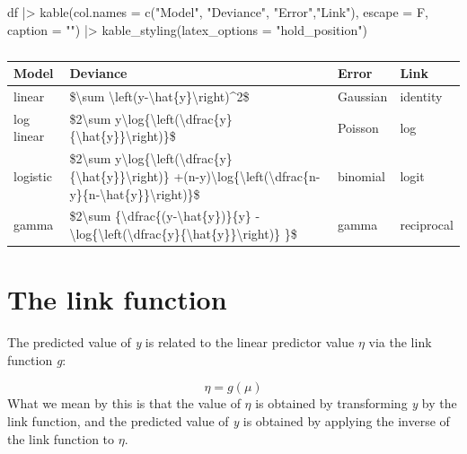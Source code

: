 \documentclass[
  letterpaper,
  DIV=11,
  numbers=noendperiod]{scrreprt}
\newenvironment{Shaded}{\begin{snugshade}}{\end{snugshade}}
\newcommand{\AttributeTok}[1]{\textcolor[rgb]{0.40,0.45,0.13}{#1}}
\newcommand{\FunctionTok}[1]{\textcolor[rgb]{0.28,0.35,0.67}{#1}}
\newcommand{\NormalTok}[1]{\textcolor[rgb]{0.00,0.23,0.31}{#1}}
\newcommand{\SpecialCharTok}[1]{\textcolor[rgb]{0.37,0.37,0.37}{#1}}
\newcommand{\StringTok}[1]{\textcolor[rgb]{0.13,0.47,0.30}{#1}}
\begin{document}
\begin{Shaded}
\begin{Highlighting}[]
\NormalTok{df }\SpecialCharTok{|\textgreater{}}
  \FunctionTok{kable}\NormalTok{(}\AttributeTok{col.names =} \FunctionTok{c}\NormalTok{(}\StringTok{"Model"}\NormalTok{, }\StringTok{"Deviance"}\NormalTok{, }\StringTok{"Error"}\NormalTok{,}\StringTok{"Link"}\NormalTok{), }\AttributeTok{escape =}\NormalTok{ F, }\AttributeTok{caption =} \StringTok{""}\NormalTok{) }\SpecialCharTok{|\textgreater{}}
  \FunctionTok{kable\_styling}\NormalTok{(}\AttributeTok{latex\_options =} \StringTok{"hold\_position"}\NormalTok{)}
\end{Highlighting}
\end{Shaded}

\begin{longtable}[t]{llll}
\caption{}\\
\toprule
Model & Deviance & Error & Link\\
\midrule
linear & \$\textbackslash{}sum \textbackslash{}left(y-\textbackslash{}hat\{y\}\textbackslash{}right)\textasciicircum{}2\$ & Gaussian & identity\\
log linear & \$2\textbackslash{}sum y\textbackslash{}log\{\textbackslash{}left(\textbackslash{}dfrac\{y\}\{\textbackslash{}hat\{y\}\}\textbackslash{}right)\}\$ & Poisson & log\\
logistic & \$2\textbackslash{}sum y\textbackslash{}log\{\textbackslash{}left(\textbackslash{}dfrac\{y\}\{\textbackslash{}hat\{y\}\}\textbackslash{}right)\} +(n-y)\textbackslash{}log\{\textbackslash{}left(\textbackslash{}dfrac\{n-y\}\{n-\textbackslash{}hat\{y\}\}\textbackslash{}right)\}\$ & binomial & logit\\
gamma & \$2\textbackslash{}sum \{\textbackslash{}dfrac\{(y-\textbackslash{}hat\{y\})\}\{y\} - \textbackslash{}log\{\textbackslash{}left(\textbackslash{}dfrac\{y\}\{\textbackslash{}hat\{y\}\}\textbackslash{}right)\} \}\$ & gamma & reciprocal\\
\bottomrule
\end{longtable}

\section{The link function}\label{the-link-function}

The predicted value of \emph{y} is related to the linear predictor value
\(\eta\) via the link function \emph{g}:

\[\eta = g(\mu)\] What we mean by this is that the value of \(\eta\) is
obtained by transforming \emph{y} by the link function, and the
predicted value of \emph{y} is obtained by applying the inverse of the
link function to \(\eta\).
\end{document}
